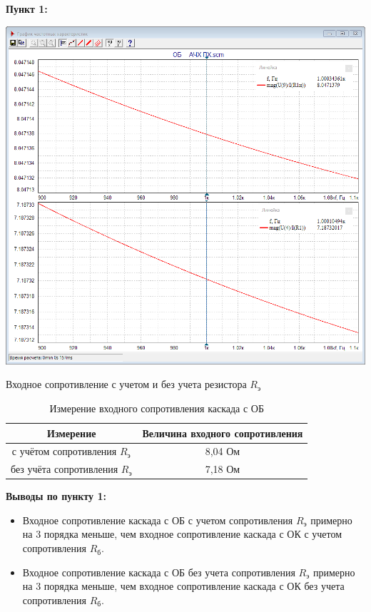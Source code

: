 \documentclass[a4paper,14pt]{extarticle}
\begin{document}
    \newpage
    \textbf{Пункт 1:}
    \begin{center}
        \includegraphics[scale=0.3]{1.png}
    \end{center}
    \begin{center}
        Входное сопротивление с учетом и без учета резистора $R_{\text{э}}$ 
    \end{center}
    \begin{table}[ht]
        \begin{center}
            \caption{Измерение входного сопротивления каскада с ОБ}
            \begin{tabular}{ |c|c| }
                \hline
                Измерение & Величина входного сопротивления\\
                \hline
                с учётом сопротивления $R_{\text{э}}$ & 8,04 Ом\\
                \hline
                без учёта сопротивления $R_{\text{э}}$ & 7,18 Ом\\
                \hline
            \end{tabular}
        \end{center}
    \end{table}
    \textbf{Выводы по пункту 1:}
    \vspace{-6ex}
    \begin{singlespace}
        \begin{itemize}
            \item Входное сопротивление каскада с ОБ с учетом сопротивления $R_{\text{э}}$ примерно на 3 порядка меньше,
             чем входное сопротивление каскада с ОК с учетом сопротивления $R_{\text{б}}$.
            \item Входное сопротивление каскада с ОБ без учета сопротивления $R_{\text{э}}$ примерно на 3 порядка меньше,
             чем входное сопротивление каскада с ОК без учета сопротивления $R_{\text{б}}$.
        \end{itemize}
    \end{singlespace}
\end{document}
